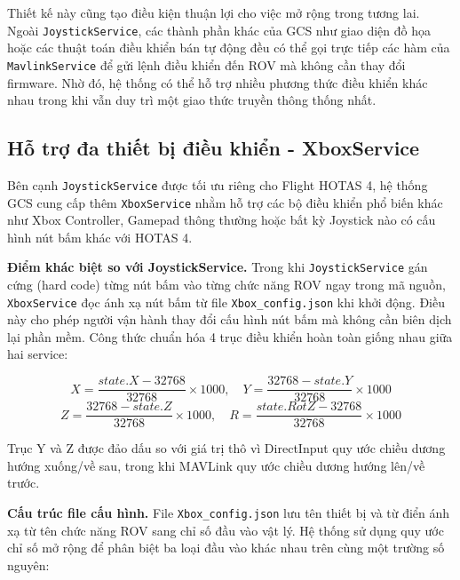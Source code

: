 \documentclass[../DoAn.tex]{subfiles}
\begin{document}
Thiết kế này cũng tạo điều kiện thuận lợi cho việc mở rộng trong tương
lai. Ngoài \texttt{JoystickService}, các thành phần khác của GCS như
giao diện đồ họa hoặc các thuật toán điều khiển bán tự động đều có thể
gọi trực tiếp các hàm của \texttt{MavlinkService} để gửi lệnh điều khiển
đến ROV mà không cần thay đổi firmware. Nhờ đó, hệ thống có thể hỗ trợ
nhiều phương thức điều khiển khác nhau trong khi vẫn duy trì một giao
thức truyền thông thống nhất.


\subsection{Hỗ trợ đa thiết bị điều khiển - XboxService}

Bên cạnh \texttt{JoystickService} được tối ưu riêng cho Flight HOTAS
4, hệ thống GCS cung cấp thêm \texttt{XboxService} nhằm hỗ trợ các
bộ điều khiển phổ biến khác như Xbox Controller, Gamepad thông thường
hoặc bất kỳ Joystick nào có cấu hình nút bấm khác với HOTAS 4.

\textbf{Điểm khác biệt so với JoystickService.}
Trong khi \texttt{JoystickService} gán cứng (hard code) từng nút bấm
vào từng chức năng ROV ngay trong mã nguồn, \texttt{XboxService} đọc
ánh xạ nút bấm từ file \texttt{Xbox\_config.json} khi khởi động.
Điều này cho phép người vận hành thay đổi cấu hình nút bấm mà không
cần biên dịch lại phần mềm. Công thức chuẩn hóa 4 trục điều khiển
hoàn toàn giống nhau giữa hai service:

\begin{equation}
    X = \frac{state.X - 32768}{32768} \times 1000, \quad
    Y = \frac{32768 - state.Y}{32768} \times 1000
\end{equation}
\begin{equation}
    Z = \frac{32768 - state.Z}{32768} \times 1000, \quad
    R = \frac{state.RotZ - 32768}{32768} \times 1000
\end{equation}

Trục Y và Z được đảo dấu so với giá trị thô vì DirectInput quy ước
chiều dương hướng xuống/về sau, trong khi MAVLink quy ước chiều dương
hướng lên/về trước.

\textbf{Cấu trúc file cấu hình.}
File \texttt{Xbox\_config.json} lưu tên thiết bị và từ điển ánh xạ
từ tên chức năng ROV sang chỉ số đầu vào vật lý. Hệ thống sử dụng
quy ước chỉ số mở rộng để phân biệt ba loại đầu vào khác nhau trên
cùng một trường số nguyên:
\end{document}
